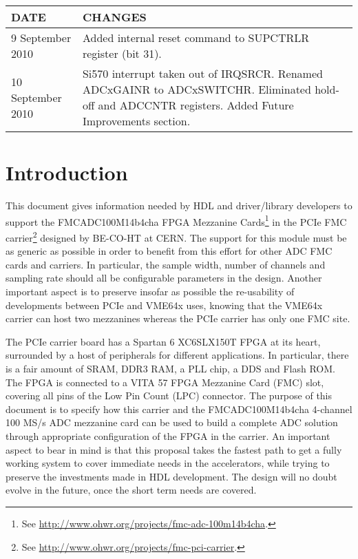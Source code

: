 \documentclass{article}
\begin{document}
\begin{table}[htbp]
  \centering
  \begin{tabularx}{\textwidth}{|l|X|}
    \hline
    \textbf{DATE} & \textbf{CHANGES} \\
    \hline
    \hline
    9 September 2010 & Added internal reset command to SUPCTRLR register (bit 31).\\
    \hline
    10 September 2010 & Si570 interrupt taken out of IRQSRCR. Renamed ADCxGAINR to ADCxSWITCHR. Eliminated hold-off and ADCCNTR registers. Added Future Improvements section.\\
    \hline
  \end{tabularx}
\end{table}

\pagebreak

\tableofcontents{}

\pagebreak

\section{Introduction}
This document gives information needed by HDL and driver/library developers to support the FMCADC100M14b4cha FPGA Mezzanine Cards\footnote{See \href{http://www.ohwr.org/projects/fmc-adc-100m14b4cha}{http://www.ohwr.org/projects/fmc-adc-100m14b4cha}.} in the PCIe FMC carrier\footnote{See \href{http://www.ohwr.org/projects/fmc-pci-carrier}{http://www.ohwr.org/projects/fmc-pci-carrier}.} designed by BE-CO-HT at CERN. The support for this module must be as generic as possible in order to benefit from this effort for other ADC FMC cards and carriers. In particular, the sample width, number of channels and sampling rate should all be configurable parameters in the design. Another important aspect is to preserve insofar as possible the re-usability of developments between PCIe and VME64x uses, knowing that the VME64x carrier can host two mezzanines whereas the PCIe carrier has only one FMC site.

The PCIe carrier board has a Spartan 6 XC6SLX150T FPGA at its heart, surrounded by a host of peripherals for different applications. In particular, there is a fair amount of SRAM, DDR3 RAM, a PLL chip, a DDS and Flash ROM. The FPGA is connected to a VITA 57 FPGA Mezzanine Card (FMC) slot, covering all pins of the Low Pin Count (LPC) connector. The purpose of this document is to specify how this carrier and the FMCADC100M14b4cha 4-channel 100 MS/s ADC mezzanine card can be used to build a complete ADC solution through appropriate configuration of the FPGA in the carrier. An important aspect to bear in mind is that this proposal takes the fastest path to get a fully working system to cover immediate needs in the accelerators, while trying to preserve the investments made in HDL development. The design will no doubt evolve in the future, once the short term needs are covered.
\end{document}
